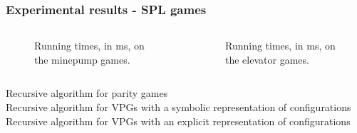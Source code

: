 \documentclass[handout,aspectratio=169]{beamer}
\begin{document}

\begin{frame}[t]
\frametitle{Experimental results - SPL games}
\def\scalegraphs{0.6}
\begin{columns}[t]
	\begin{column}{0.5\textwidth}
		\begin{figure}[H]
			
			\caption{Running times, in ms, on the minepump games.}
			\label{fig:results_minepump}
		\end{figure}%
	\end{column}
	\begin{column}{0.5\textwidth}
		\begin{figure}[H]
			
			\caption{Running times, in ms, on the elevator games.}
			\label{fig:results_elevator}
		\end{figure}%
	\end{column}
\end{columns}
\small
{} Recursive algorithm for parity games\\
 Recursive algorithm for VPGs with a symbolic representation of configurations\\
 Recursive algorithm for VPGs with an explicit representation of configurations\\
\end{frame}

\end{document}
